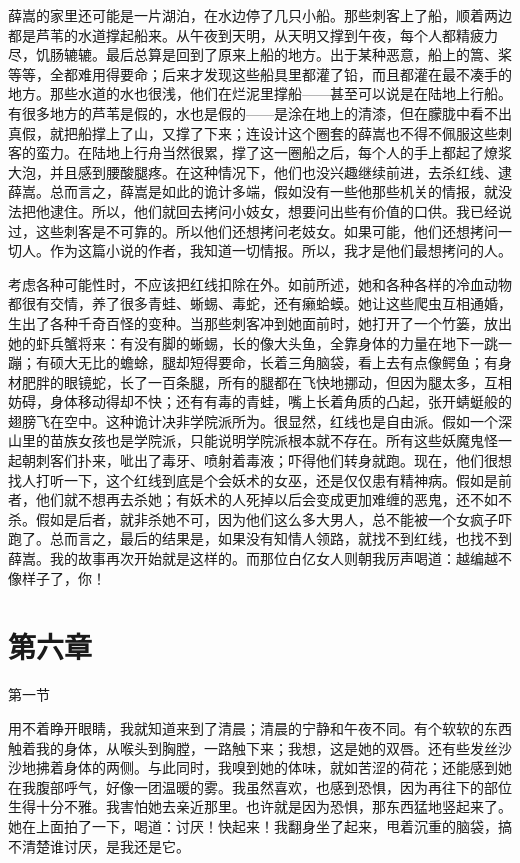 薛嵩的家里还可能是一片湖泊，在水边停了几只小船。那些刺客上了船，顺着两边都是芦苇的水道撑起船来。从午夜到天明，从天明又撑到午夜，每个人都精疲力尽，饥肠辘辘。最后总算是回到了原来上船的地方。出于某种恶意，船上的篙、桨等等，全都难用得要命；后来才发现这些船具里都灌了铅，而且都灌在最不凑手的地方。那些水道的水也很浅，他们在烂泥里撑船——甚至可以说是在陆地上行船。有很多地方的芦苇是假的，水也是假的——是涂在地上的清漆，但在朦胧中看不出真假，就把船撑上了山，又撑了下来；连设计这个圈套的薛嵩也不得不佩服这些刺客的蛮力。在陆地上行舟当然很累，撑了这一圈船之后，每个人的手上都起了燎浆大泡，并且感到腰酸腿疼。在这种情况下，他们也没兴趣继续前进，去杀红线、逮薛嵩。总而言之，薛嵩是如此的诡计多端，假如没有一些他那些机关的情报，就没法把他逮住。所以，他们就回去拷问小妓女，想要问出些有价值的口供。我已经说过，这些刺客是不可靠的。所以他们还想拷问老妓女。如果可能，他们还想拷问一切人。作为这篇小说的作者，我知道一切情报。所以，我才是他们最想拷问的人。 

考虑各种可能性时，不应该把红线扣除在外。如前所述，她和各种各样的冷血动物都很有交情，养了很多青蛙、蜥蜴、毒蛇，还有癞蛤蟆。她让这些爬虫互相通婚，生出了各种千奇百怪的变种。当那些刺客冲到她面前时，她打开了一个竹篓，放出她的虾兵蟹将来：有没有脚的蜥蜴，长的像大头鱼，全靠身体的力量在地下一跳一蹦；有硕大无比的蟾蜍，腿却短得要命，长着三角脑袋，看上去有点像鳄鱼；有身材肥胖的眼镜蛇，长了一百条腿，所有的腿都在飞快地挪动，但因为腿太多，互相妨碍，身体移动得却不快；还有有毒的青蛙，嘴上长着角质的凸起，张开蜻蜓般的翅膀飞在空中。这种诡计决非学院派所为。很显然，红线也是自由派。假如一个深山里的苗族女孩也是学院派，只能说明学院派根本就不存在。所有这些妖魔鬼怪一起朝刺客们扑来，呲出了毒牙、喷射着毒液；吓得他们转身就跑。现在，他们很想找人打听一下，这个红线到底是个会妖术的女巫，还是仅仅患有精神病。假如是前者，他们就不想再去杀她；有妖术的人死掉以后会变成更加难缠的恶鬼，还不如不杀。假如是后者，就非杀她不可，因为他们这么多大男人，总不能被一个女疯子吓跑了。总而言之，最后的结果是，如果没有知情人领路，就找不到红线，也找不到薛嵩。我的故事再次开始就是这样的。而那位白亿女人则朝我厉声喝道：越编越不像样子了，你！ 

\section{第六章}

第一节 

用不着睁开眼睛，我就知道来到了清晨；清晨的宁静和午夜不同。有个软软的东西触着我的身体，从喉头到胸膛，一路触下来；我想，这是她的双唇。还有些发丝沙沙地拂着身体的两侧。与此同时，我嗅到她的体味，就如苦涩的荷花；还能感到她在我腹部呼气，好像一团温暖的雾。我虽然喜欢，也感到恐惧，因为再往下的部位生得十分不雅。我害怕她去亲近那里。也许就是因为恐惧，那东西猛地竖起来了。她在上面拍了一下，喝道：讨厌！快起来！我翻身坐了起来，甩着沉重的脑袋，搞不清楚谁讨厌，是我还是它。 


